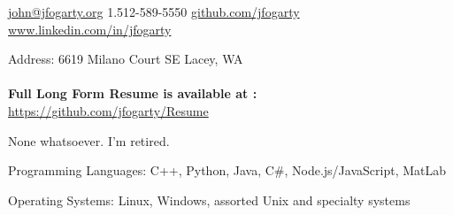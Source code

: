 \documentclass[10pt,letterpaper]{article}
\begin{document}
\sloppy  %



\nobreakvspace{1em}  %

\noindent\href{mailto:john.at.jfogarty.dot.org}{john\mbox{}@\mbox{}jfogarty.org}\sbull
\textsmaller{+}1.512-589-5550\sbull
\href{https://github.com/jfogarty}{github.com/jfogarty}
\sbull
\href{http://www.linkedin.com/in/jfogarty}{www.linkedin.com/in/jfogarty}

\nobreakvspace{1mm}  %
\noindent
Address: 6619 Milano Court SE\sbull
Lacey, WA
\\
\\
\textbf{Full Long Form Resume is available at :}
\href{https://github.com/jfogarty/Resume/raw/master/jfogarty-resume-2022.pdf}{https://github.com/jfogarty/Resume}

\spacedhrule{0.9em}{-0.4em}  %



\inlineheadsection
{None whatsoever. I'm retired.}
{}

\vspace{1em}\spacedhrule{0.5em}{-0.4em}


\vspace{0.5em}
\inlineheadsection
{Programming Languages:}
{C++, Python, Java, C\#, Node.js/JavaScript, MatLab}

\vspace{0.5em}\inlineheadsection
{Operating Systems:}
{Linux, Windows, assorted Unix and specialty systems}
\end{document}
